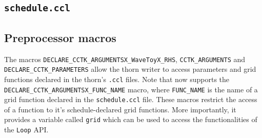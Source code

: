 \subsection{\texttt{schedule.ccl}}


\subsection{Preprocessor macros}


The macros \texttt{DECLARE\_CCTK\_ARGUMENTSX\_WaveToyX\_RHS}, \texttt{CCTK\_ARGUMENTS} and \texttt{DECLARE\_CCTK\_PARAMETERS} allow the thorn writer to access parameters and grid functions declared in the thorn's \texttt{.ccl} files. Note that \Cactus\space now supports the \texttt{DECLARE\_CCTK\_ARGUMENTSX\_FUNC\_NAME} macro, where \texttt{FUNC\_NAME} is the name of a grid function declared in the \texttt{schedule.ccl} file. These macros restrict the access of a function to it's schedule-declared grid functions. More importantly, it provides a variable called \texttt{grid} which can be used to access the functionalities of the \texttt{Loop} API.